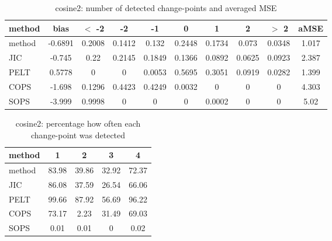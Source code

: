 \begin{table}[ht]
\centering
\begin{tabular}{l|c|ccccccc|c}
  \hline
method & bias & $<$ -2 & -2 & -1 & 0 & 1 & 2 & $>$ 2 & aMSE \\ 
  \hline
method & -0.6891 & 0.2008 & 0.1412 & 0.132 & 0.2448 & 0.1734 & 0.073 & 0.0348 & 1.017 \\ 
  JIC & -0.745 &  0.22 & 0.2145 & 0.1849 & 0.1366 & 0.0892 & 0.0625 & 0.0923 & 2.387 \\ 
  PELT & 0.5778 &     0 &     0 & 0.0053 & 0.5695 & 0.3051 & 0.0919 & 0.0282 & 1.399 \\ 
  COPS & -1.698 & 0.1296 & 0.4423 & 0.4249 & 0.0032 &     0 &     0 &     0 & 4.303 \\ 
  SOPS & -3.999 & 0.9998 &     0 &     0 &     0 & 0.0002 &     0 &     0 &  5.02 \\ 
   \hline
\end{tabular}
\caption{cosine2: number of detected change-points and averaged MSE} 
\label{tab:cosine2Njumps}
\end{table}
\begin{table}[ht]
\centering
\begin{tabular}{l|cccc}
  \hline
method & 1 & 2 & 3 & 4 \\ 
  \hline
method &  83.98 &  39.86 &  32.92 &  72.37 \\ 
  JIC &  86.08 &  37.59 &  26.54 &  66.06 \\ 
  PELT &  99.66 &  87.92 &  56.69 &  96.22 \\ 
  COPS &  73.17 &   2.23 &  31.49 &  69.03 \\ 
  SOPS &   0.01 &   0.01 &      0 &   0.02 \\ 
   \hline
\end{tabular}
\caption{cosine2: percentage how often each change-point was detected} 
\label{tab:cosine2Detections}
\end{table}
